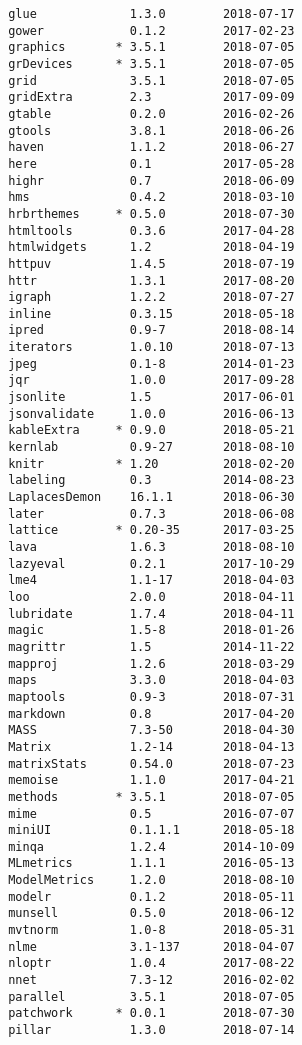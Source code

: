 \documentclass[twoside,12pt,final]{ucthesis-CA2012}
\begin{document}
\begin{ucmainmatter}
\begin{verbatim}
 glue             1.3.0        2018-07-17
 gower            0.1.2        2017-02-23
 graphics       * 3.5.1        2018-07-05
 grDevices      * 3.5.1        2018-07-05
 grid             3.5.1        2018-07-05
 gridExtra        2.3          2017-09-09
 gtable           0.2.0        2016-02-26
 gtools           3.8.1        2018-06-26
 haven            1.1.2        2018-06-27
 here             0.1          2017-05-28
 highr            0.7          2018-06-09
 hms              0.4.2        2018-03-10
 hrbrthemes     * 0.5.0        2018-07-30
 htmltools        0.3.6        2017-04-28
 htmlwidgets      1.2          2018-04-19
 httpuv           1.4.5        2018-07-19
 httr             1.3.1        2017-08-20
 igraph           1.2.2        2018-07-27
 inline           0.3.15       2018-05-18
 ipred            0.9-7        2018-08-14
 iterators        1.0.10       2018-07-13
 jpeg             0.1-8        2014-01-23
 jqr              1.0.0        2017-09-28
 jsonlite         1.5          2017-06-01
 jsonvalidate     1.0.0        2016-06-13
 kableExtra     * 0.9.0        2018-05-21
 kernlab          0.9-27       2018-08-10
 knitr          * 1.20         2018-02-20
 labeling         0.3          2014-08-23
 LaplacesDemon    16.1.1       2018-06-30
 later            0.7.3        2018-06-08
 lattice        * 0.20-35      2017-03-25
 lava             1.6.3        2018-08-10
 lazyeval         0.2.1        2017-10-29
 lme4             1.1-17       2018-04-03
 loo              2.0.0        2018-04-11
 lubridate        1.7.4        2018-04-11
 magic            1.5-8        2018-01-26
 magrittr         1.5          2014-11-22
 mapproj          1.2.6        2018-03-29
 maps             3.3.0        2018-04-03
 maptools         0.9-3        2018-07-31
 markdown         0.8          2017-04-20
 MASS             7.3-50       2018-04-30
 Matrix           1.2-14       2018-04-13
 matrixStats      0.54.0       2018-07-23
 memoise          1.1.0        2017-04-21
 methods        * 3.5.1        2018-07-05
 mime             0.5          2016-07-07
 miniUI           0.1.1.1      2018-05-18
 minqa            1.2.4        2014-10-09
 MLmetrics        1.1.1        2016-05-13
 ModelMetrics     1.2.0        2018-08-10
 modelr           0.1.2        2018-05-11
 munsell          0.5.0        2018-06-12
 mvtnorm          1.0-8        2018-05-31
 nlme             3.1-137      2018-04-07
 nloptr           1.0.4        2017-08-22
 nnet             7.3-12       2016-02-02
 parallel         3.5.1        2018-07-05
 patchwork      * 0.0.1        2018-07-30
 pillar           1.3.0        2018-07-14

\end{verbatim}
\end{ucmainmatter}
\end{document}
